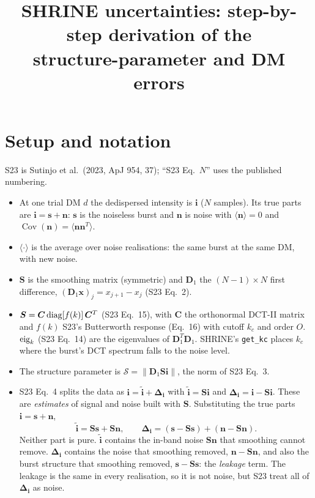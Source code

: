 \documentclass[11pt]{article}
\title{SHRINE uncertainties: step-by-step derivation of the\\ structure-parameter and DM errors}
\author{}
\date{}
\newcommand{\vb}[1]{\boldsymbol{#1}}
\newcommand{\Dn}{\vb D_1}
\newcommand{\Sm}{\vb S}
\newcommand{\ti}{\tilde{\vb i}}
\newcommand{\Di}{\vb\Delta_{\vb i}}
\newcommand{\nrm}[1]{\lVert #1\rVert}
\newcommand{\Sc}{\mathcal S}
\newcommand{\Cov}{\operatorname{Cov}}
\begin{document}
\maketitle
\vspace{-1.5cm}

\section*{Setup and notation}

S23 is Sutinjo et al.\ (2023, ApJ 954, 37); ``S23 Eq.~$N$'' uses the published numbering.

\begin{itemize}
\item At one trial DM $d$ the dedispersed intensity is $\vb i$ ($N$ samples). Its true parts are
$\vb i=\vb s+\vb n$: $\vb s$ is the noiseless burst and $\vb n$ is noise with
$\langle\vb n\rangle=0$ and $\Cov(\vb n)=\langle\vb n\vb n^{T}\rangle$.
\item $\langle\cdot\rangle$ is the average over noise realisations: the same burst at the same DM, with new noise.
\item $\Sm$ is the smoothing matrix (symmetric) and $\Dn$ the $(N-1)\times N$ first difference,
$(\Dn\vb x)_j=x_{j+1}-x_j$ (S23 Eq.~2).
\item $\Sm=\vb C\,{\rm diag}[f(k)]\,\vb C^{T}$ (S23 Eq.~15), with $\vb C$ the orthonormal DCT-II matrix and $f(k)$ S23's
Butterworth response (Eq.~16) with cutoff $k_c$ and order $O$. ${\rm eig}_k$ (S23 Eq.~14) are the eigenvalues of
$\Dn^{T}\Dn$. SHRINE's \texttt{get\_kc} places $k_c$ where the burst's DCT spectrum falls to the noise level.
\item The structure parameter is $\Sc=\nrm{\Dn\Sm\vb i}$, the norm of S23 Eq.~3.
\item S23 Eq.~4 splits the data as $\vb i=\ti+\Di$ with $\ti=\Sm\vb i$ and $\Di=\vb i-\Sm\vb i$. These are
\emph{estimates} of signal and noise built with $\Sm$. Substituting the true parts $\vb i=\vb s+\vb n$,
\begin{equation}
\ti=\Sm\vb s+\Sm\vb n,\qquad \Di=(\vb s-\Sm\vb s)+(\vb n-\Sm\vb n).
\label{eq:split}
\end{equation}
Neither part is pure. $\ti$ contains the in-band noise $\Sm\vb n$ that smoothing cannot remove. $\Di$ contains the
noise that smoothing removed, $\vb n-\Sm\vb n$, and also the burst structure that smoothing removed,
$\vb s-\Sm\vb s$: the \emph{leakage} term. The leakage is the same in every realisation, so it is not noise, but S23
treat all of $\Di$ as noise.
\end{itemize}
\end{document}
